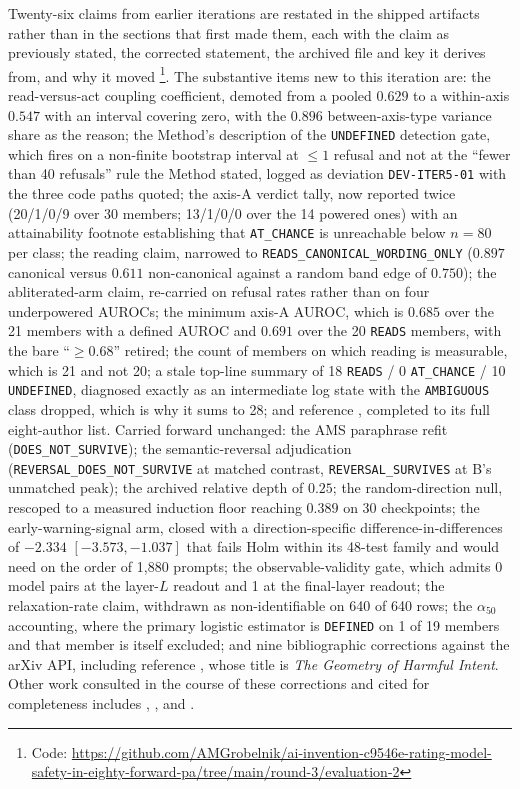 \documentclass[11pt,letterpaper]{article}
\begin{document}
Twenty-six claims from earlier iterations are restated in the shipped artifacts rather than in the sections that first made them, each with the claim as previously stated, the corrected statement, the archived file and key it derives from, and why it moved \footnote{Code: \url{https://github.com/AMGrobelnik/ai-invention-c9546e-rating-model-safety-in-eighty-forward-pa/tree/main/round-3/evaluation-2}}. The substantive items new to this iteration are: the read-versus-act coupling coefficient, demoted from a pooled $0.629$ to a within-axis $0.547$ with an interval covering zero, with the $0.896$ between-axis-type variance share as the reason; the Method's description of the \texttt{UNDEFINED} detection gate, which fires on a non-finite bootstrap interval at $\leq 1$ refusal and not at the ``fewer than 40 refusals'' rule the Method stated, logged as deviation \texttt{DEV-ITER5-01} with the three code paths quoted; the axis-A verdict tally, now reported twice (20/1/0/9 over 30 members; 13/1/0/0 over the 14 powered ones) with an attainability footnote establishing that \texttt{AT\_CHANCE} is unreachable below $n = 80$ per class; the reading claim, narrowed to \texttt{READS\_CANONICAL\_WORDING\_ONLY} ($0.897$ canonical versus $0.611$ non-canonical against a random band edge of $0.750$); the abliterated-arm claim, re-carried on refusal rates rather than on four underpowered AUROCs; the minimum axis-A AUROC, which is $0.685$ over the 21 members with a defined AUROC and $0.691$ over the 20 \texttt{READS} members, with the bare ``$\geq 0.68$'' retired; the count of members on which reading is measurable, which is 21 and not 20; a stale top-line summary of 18 \texttt{READS} / 0 \texttt{AT\_CHANCE} / 10 \texttt{UNDEFINED}, diagnosed exactly as an intermediate log state with the \texttt{AMBIGUOUS} class dropped, which is why it sums to 28; and reference \citep{Basu2026}, completed to its full eight-author list. Carried forward unchanged: the AMS paraphrase refit (\texttt{DOES\_NOT\_SURVIVE}); the semantic-reversal adjudication (\texttt{REVERSAL\_DOES\_NOT\_SURVIVE} at matched contrast, \texttt{REVERSAL\_SURVIVES} at B's unmatched peak); the archived relative depth of $0.25$; the random-direction null, rescoped to a measured induction floor reaching $0.389$ on 30 checkpoints; the early-warning-signal arm, closed with a direction-specific difference-in-differences of $-2.334$ $[-3.573, -1.037]$ that fails Holm within its 48-test family and would need on the order of 1,880 prompts; the observable-validity gate, which admits 0 model pairs at the layer-$L$ readout and 1 at the final-layer readout; the relaxation-rate claim, withdrawn as non-identifiable on 640 of 640 rows; the $\alpha_{50}$ accounting, where the primary logistic estimator is \texttt{DEFINED} on 1 of 19 members and that member is itself excluded; and nine bibliographic corrections against the arXiv API, including reference \citep{Llorente2026}, whose title is \emph{The Geometry of Harmful Intent}. Other work consulted in the course of these corrections and cited for completeness includes \citet{Rahimi2026}, \citet{Kwon2026}, \citet{Taimeskhanov2026} and \citet{BenAllal2025}.



\end{document}
